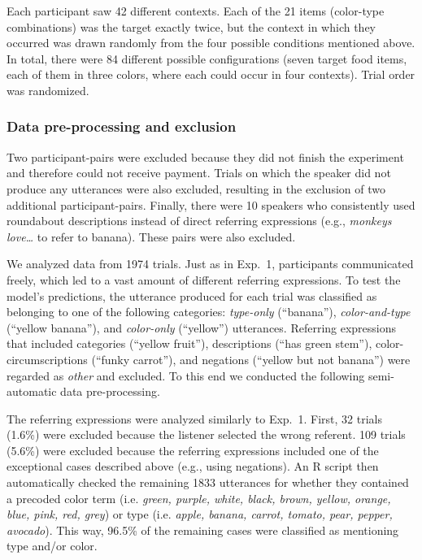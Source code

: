 \documentclass[11pt]{article}
\begin{document}
Each participant saw 42 different contexts. Each of the 21 items (color-type combinations) was the target exactly twice, but the context in which they occurred was drawn randomly from the four possible conditions mentioned above. In total, there were 84 different possible configurations (seven target food items, each of them in three colors, where each could occur in four contexts). Trial order was randomized.


\subsubsection{Data pre-processing and exclusion}

Two participant-pairs were excluded because they did not finish the experiment and therefore could not receive payment. Trials on which the speaker did not produce any utterances were also excluded, resulting in the exclusion of two additional participant-pairs.
Finally, there were 10 speakers who consistently used roundabout descriptions instead of direct referring expressions (e.g., \emph{monkeys love\dots} to refer to banana). These pairs were also excluded.

We analyzed data from 1974 trials. Just as in Exp.~1, participants communicated freely, which led to a vast amount of different referring expressions. To test the model's predictions, the utterance produced for each trial was classified as belonging to one of the following categories: \textit{type-only} (``banana''), \textit{color-and-type} (``yellow banana''), and \textit{color-only} (``yellow'') utterances. Referring expressions that included categories (``yellow fruit''), descriptions (``has green stem''), color-circumscriptions (``funky carrot''), and negations (``yellow but not banana'') were regarded as \textit{other} and excluded. To this end we conducted the following semi-automatic data pre-processing.

The referring expressions were analyzed similarly to Exp.~1. First, 32 trials (1.6\%) were excluded because the listener selected the wrong referent. 109 trials (5.6\%) were excluded because the referring expressions included one of the exceptional cases described above (e.g., using negations). 
An R script then automatically checked the remaining 1833 utterances for whether they contained a precoded color term (i.e. \emph{green, purple, white, black, brown, yellow, orange, blue, pink, red, grey}) or type (i.e. \emph{apple, banana, carrot, tomato, pear, pepper, avocado}). This way, 96.5\% of the remaining cases were classified as mentioning type and/or color. 
\end{document}
